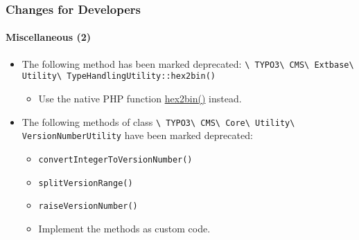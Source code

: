 \begin{frame}[fragile]
	\frametitle{Changes for Developers}
	\framesubtitle{Miscellaneous (2)}

	\begin{itemize}

		\item The following method has been marked deprecated:\newline
			\smaller\texttt{\textbackslash
				TYPO3\textbackslash
				CMS\textbackslash
				Extbase\textbackslash
				Utility\textbackslash
				TypeHandlingUtility::hex2bin()}\normalsize

			\begin{itemize}\smaller
				\item[\ding{228}] Use the native PHP function \href{https://www.php.net/manual/en/function.hex2bin.php}{hex2bin()} instead.
			\end{itemize}\normalsize

		\item The following methods of class
			\smaller\texttt{\textbackslash
				TYPO3\textbackslash
				CMS\textbackslash
				Core\textbackslash
				Utility\textbackslash
				VersionNumberUtility}\normalsize\newline
			have been marked deprecated:

			\begin{itemize}
				\item \texttt{convertIntegerToVersionNumber()}
				\item \texttt{splitVersionRange()}
				\item \texttt{raiseVersionNumber()}
			\end{itemize}

			\begin{itemize}\smaller
				\item[\ding{228}] Implement the methods as custom code.
			\end{itemize}\normalsize

	\end{itemize}

\end{frame}


